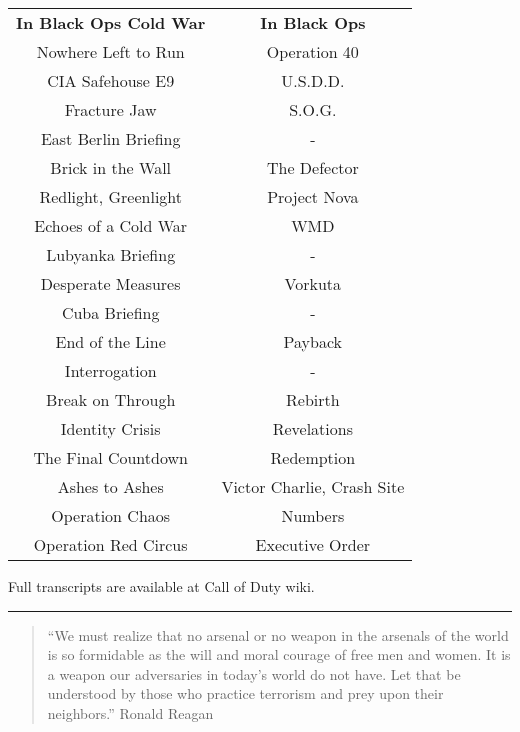 \documentclass{article}
\begin{document}
\begin{table}[]
    \begin{tabular}{cc}
        \textbf{In Black Ops Cold War} & \textbf{In Black Ops}      \\
        Nowhere Left to Run            & Operation 40               \\
        CIA Safehouse E9               & U.S.D.D.                   \\
        Fracture Jaw                   & S.O.G.                     \\
        East Berlin Briefing           & -                          \\
        Brick in the Wall              & The Defector               \\
        Redlight, Greenlight           & Project Nova               \\
        Echoes of a Cold War           & WMD                        \\
        Lubyanka Briefing              & -                          \\
        Desperate Measures             & Vorkuta                    \\
        Cuba Briefing                  & -                          \\
        End of the Line                & Payback                    \\
        Interrogation                  & -                          \\
        Break on Through               & Rebirth                    \\
        Identity Crisis                & Revelations                \\
        The Final Countdown            & Redemption                 \\
        Ashes to Ashes                 & Victor Charlie, Crash Site \\
        Operation Chaos                & Numbers                    \\
        Operation Red Circus           & Executive Order           
    \end{tabular}
\end{table}

Full transcripts are available at Call of Duty wiki.

\rule{8cm}{0.4pt}

\begin{quote}
    “We must realize that no arsenal or no weapon in the arsenals of the world is so formidable as the will and moral courage of free men and women. It is a weapon our adversaries in today's world do not have. Let that be understood by those who practice terrorism and prey upon their neighbors.” Ronald Reagan
\end{quote}
\end{document}

